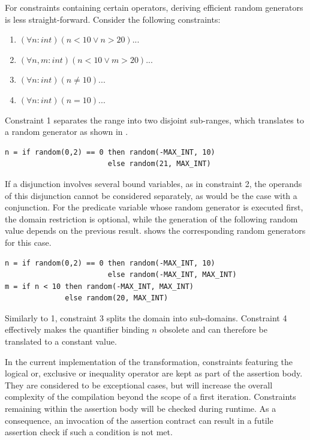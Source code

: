 For constraints containing certain operators, deriving efficient random generators is less straight-forward. Consider the following constraints:
\begin{enumerate}
\itemsep-0.7em
\item $(\forall n : int) (n < 10 \lor n > 20) ...$
\item $(\forall n,m : int) (n < 10 \lor m > 20) ...$
\item $(\forall n : int) (n \ne 10) ...$
\item $(\forall n : int) (n = 10) ...$
\end{enumerate}
Constraint 1 separates the range into two disjoint sub-ranges, which translates to a random generator as shown in .
\begin{lstlisting}[label=lst:rand_disjoint, caption=Random generator with two disjoint ranges, numbers=none]
n = if random(0,2) == 0 then random(-MAX_INT, 10)
                        else random(21, MAX_INT)
\end{lstlisting}
If a disjunction involves several bound variables, as in constraint 2, the operands of this disjunction cannot be considered separately, as would be the case with a conjunction. For the predicate variable whose random generator is executed first, the domain restriction is optional, while the generation of the following random value depends on the previous result.  shows the corresponding random generators for this case.
\begin{lstlisting}[label=lst:rand_disjoint_nm, caption=Random generators of a disjunction of constraints with two bound variables, numbers=none]
n = if random(0,2) == 0 then random(-MAX_INT, 10)
                        else random(-MAX_INT, MAX_INT)
m = if n < 10 then random(-MAX_INT, MAX_INT)
              else random(20, MAX_INT)
\end{lstlisting}
Similarly to 1, constraint 3 splits the domain into sub-domains. Constraint 4 effectively makes the quantifier binding $n$ obsolete and can therefore be translated to a constant value.

In the current implementation of the transformation, constraints featuring the logical or, exclusive or inequality operator are kept as part of the assertion body. They are considered to be exceptional cases, but will increase the overall complexity of the compilation beyond the scope of a first iteration. Constraints remaining within the assertion body will be checked during runtime. As a consequence, an invocation of the assertion contract can result in a futile assertion check if such a condition is not met.

